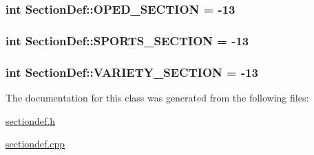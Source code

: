 \subsubsection[{O\+P\+E\+D\+\_\+\+S\+E\+C\+T\+I\+O\+N}]{\setlength{\rightskip}{0pt plus 5cm}int Section\+Def\+::\+O\+P\+E\+D\+\_\+\+S\+E\+C\+T\+I\+O\+N = -\/13\hspace{0.3cm}{\ttfamily [static]}}\label{class_section_def_a0dc4ceef9e5bcca670b1b69468a0c7ff}
\hypertarget{class_section_def_a8bbfa4fa374b5b052294c69a4c91c843}{}
\subsubsection[{S\+P\+O\+R\+T\+S\+\_\+\+S\+E\+C\+T\+I\+O\+N}]{\setlength{\rightskip}{0pt plus 5cm}int Section\+Def\+::\+S\+P\+O\+R\+T\+S\+\_\+\+S\+E\+C\+T\+I\+O\+N = -\/13\hspace{0.3cm}{\ttfamily [static]}}\label{class_section_def_a8bbfa4fa374b5b052294c69a4c91c843}
\hypertarget{class_section_def_a3f3342f9acb38ee743a100dd33ac75e9}{}
\subsubsection[{V\+A\+R\+I\+E\+T\+Y\+\_\+\+S\+E\+C\+T\+I\+O\+N}]{\setlength{\rightskip}{0pt plus 5cm}int Section\+Def\+::\+V\+A\+R\+I\+E\+T\+Y\+\_\+\+S\+E\+C\+T\+I\+O\+N = -\/13\hspace{0.3cm}{\ttfamily [static]}}\label{class_section_def_a3f3342f9acb38ee743a100dd33ac75e9}


The documentation for this class was generated from the following files\+:\begin{DoxyCompactItemize}
\item 
\hyperlink{sectiondef_8h}{sectiondef.\+h}\item 
\hyperlink{sectiondef_8cpp}{sectiondef.\+cpp}\end{DoxyCompactItemize}
